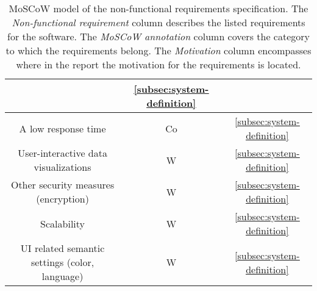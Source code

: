 \begin{table}[H]
{\begin{tabular}{ccc}
            & {\ul{\ref{subsec:system-definition}}}
            \\ \midrule
            A low response time
            & Co
            & {\ul{\ref{subsec:system-definition}}}
            \\ \midrule
            User-interactive data visualizations
            & W
            & {\ul{\ref{subsec:system-definition}}}
            \\ \midrule
            Other security measures (encryption)
            & W
            & {\ul{\ref{subsec:system-definition}}}
            \\ \midrule
            Scalability
            & W
            & {\ul{\ref{subsec:system-definition}}}
            \\ \midrule
            UI related semantic settings (color, language)
            & W
            & {\ul{\ref{subsec:system-definition}}}
            \\ \bottomrule
        \end{tabular}%
    }
    \caption{MoSCoW model of the non-functional requirements specification.
    The \textit{Non-functional requirement} column describes the listed requirements for the software.
    The \textit{MoSCoW annotation} column covers the category to which the requirements belong.
    The \textit{Motivation} column encompasses where in the report the motivation for the requirements is located.
    }\label{tab:non-functional-requirements-specification}
\end{table}
